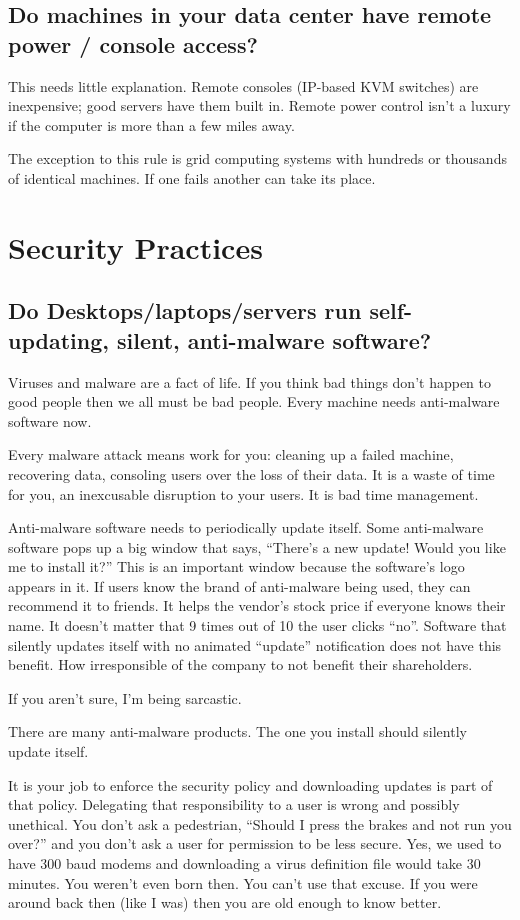 \documentclass{article}
\begin{document}
\subsection{Do machines in your data center have remote power / console access?}
This needs little explanation. Remote consoles (IP-based KVM switches) are inexpensive; good servers have them built in. Remote power control isn't a luxury if the computer is more than a few miles away.

The exception to this rule is grid computing systems with hundreds or thousands of identical machines. If one fails another can take its place.

\section{Security Practices}
\subsection{Do Desktops/laptops/servers run self-updating, silent, anti-malware software?}
Viruses and malware are a fact of life. If you think bad things don't happen to good people then we all must be bad people. Every machine needs anti-malware software now.

Every malware attack means work for you: cleaning up a failed machine, recovering data, consoling users over the loss of their data. It is a waste of time for you, an inexcusable disruption to your users. It is bad time management.

Anti-malware software needs to periodically update itself. Some anti-malware software pops up a big window that says, ``There's a new update! Would you like me to install it?'' This is an important window because the software's logo appears in it. If users know the brand of anti-malware being used, they can recommend it to friends. It helps the vendor's stock price if everyone knows their name. It doesn't matter that 9 times out of 10 the user clicks ``no''. Software that silently updates itself with no animated ``update'' notification does not have this benefit. How irresponsible of the company to not benefit their shareholders.

If you aren't sure, I'm being sarcastic.

There are many anti-malware products. The one you install should silently update itself.

It is your job to enforce the security policy and downloading updates is part of that policy. Delegating that responsibility to a user is wrong and possibly unethical. You don't ask a pedestrian, ``Should I press the brakes and not run you over?'' and you don't ask a user for permission to be less secure. Yes, we used to have 300 baud modems and downloading a virus definition file would take 30 minutes. You weren't even born then. You can't use that excuse. If you were around back then (like I was) then you are old enough to know better.
\end{document}
